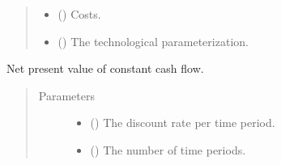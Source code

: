 \documentclass[letterpaper,10pt,english]{sphinxmanual}
\begin{document}
\begin{fulllineitems}
\begin{quote}
\begin{description}
\begin{itemize}
\item {} 
 () \textendash{} Costs.

\item {} 
 () \textendash{} The technological parameterization.

\end{itemize}

\end{description}\end{quote}

\end{fulllineitems}


\begin{fulllineitems}
\label{\detokenize{doc-src/technology:technology.pv_residential_simple.npv}}
Net present value of constant cash flow.
\begin{quote}\begin{description}
\item[{Parameters}] \leavevmode\begin{itemize}
\item {} 
 () \textendash{} The discount rate per time period.

\item {} 
 () \textendash{} The number of time periods.

\end{itemize}

\end{description}\end{quote}

\end{fulllineitems}

\end{document}
